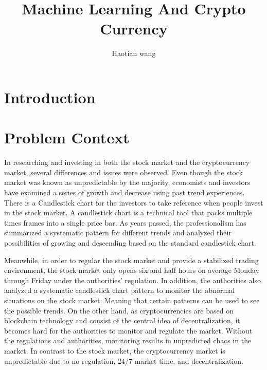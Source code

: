 \documentclass[10pt,twocolumn]{article}
\title{Machine Learning And Crypto Currency}
\author{Haotian wang}
\affiliation{Occidental College}
\begin{document}
\maketitle

\begin{abstract}
   \end{abstract}

\section{Introduction}

\section{Problem Context}
	In researching and investing in both the stock market and the cryptocurrency market, several differences and issues were observed. Even though the stock market was known as unpredictable by the majority, economists and investors have examined a series of growth and decrease using past trend experiences. There is a Candlestick chart for the investors to take reference when people invest in the stock market. A candlestick chart is a technical tool that packs multiple times frames into a single price bar. As years passed, the professionalism has summarized a systematic pattern for different trends and analyzed their possibilities of growing and descending based on the standard candlestick chart.

	Meanwhile, in order to regular the stock market and provide a stabilized trading environment, the stock market only opens six and half hours on average Monday through Friday under the authorities' regulation. In addition, the authorities also analyzed a systematic candlestick chart pattern to monitor the abnormal situations on the stock market; Meaning that certain patterns can be used to see the possible trends. On the other hand, as cryptocurrencies are based on blockchain technology and consist of the central idea of decentralization, it becomes hard for the authorities to monitor and regulate the market. Without the regulations and authorities, monitoring results in unpredicted chaos in the market. In contrast to the stock market, the cryptocurrency market is unpredictable due to no regulation, 24/7 market time, and decentralization. 
\end{document}
